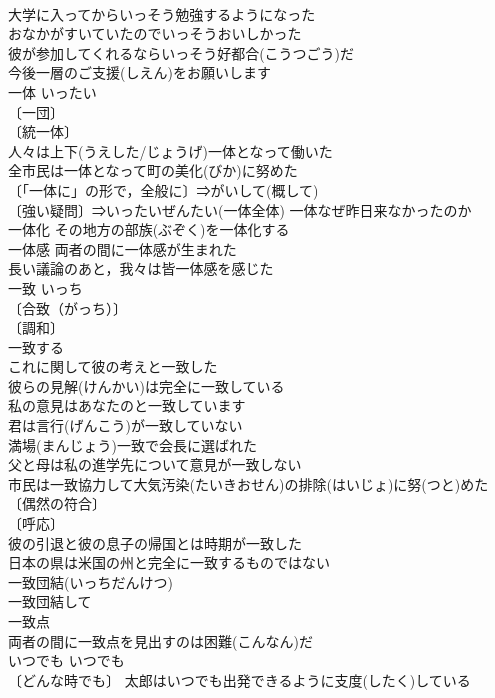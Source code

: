 \documentclass[8pt]{extreport}
\begin{document}
\begin{CJK}{UTF8}{min}
\\	大学に入ってからいっそう勉強するようになった 
\\	おなかがすいていたのでいっそうおいしかった 
\\	彼が参加してくれるならいっそう好都合(こうつごう)だ 
\\	今後一層のご支援(しえん)をお願いします 
\\	一体	いったい	
\\	〔一団〕
\\	〔統一体〕
\\	人々は上下(うえした/じょうげ)一体となって働いた 
\\	全市民は一体となって町の美化(びか)に努めた 
\\	〔「一体に」の形で，全般に〕⇒がいして(概して)
\\	〔強い疑問〕⇒いったいぜんたい(一体全体) 一体なぜ昨日来なかったのか 
\\	一体化 その地方の部族(ぶぞく)を一体化する 
\\	一体感 両者の間に一体感が生まれた 
\\	長い議論のあと，我々は皆一体感を感じた 
\\	一致	いっち	
\\	〔合致（がっち）〕
\\	〔調和〕
\\	一致する 
\\	これに関して彼の考えと一致した 
\\	彼らの見解(けんかい)は完全に一致している 
\\	私の意見はあなたのと一致しています 
\\	君は言行(げんこう)が一致していない 
\\	満場(まんじょう)一致で会長に選ばれた 
\\	父と母は私の進学先について意見が一致しない 
\\	市民は一致協力して大気汚染(たいきおせん)の排除(はいじょ)に努(つと)めた 
\\	〔偶然の符合〕
\\	〔呼応〕
\\	彼の引退と彼の息子の帰国とは時期が一致した 
\\	日本の県は米国の州と完全に一致するものではない 
\\	一致団結(いっちだんけつ) 
\\	一致団結して 
\\	一致点 
\\	両者の間に一致点を見出すのは困難(こんなん)だ 
\\	いつでも	いつでも	
\\	〔どんな時でも〕 太郎はいつでも出発できるように支度(したく)している 

\end{CJK}
\end{document}
